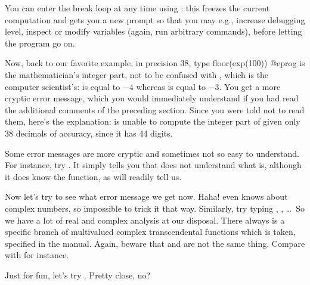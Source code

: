  You can enter the break loop at any time using
: this freezes the current computation and gets you a new
prompt so that you may e.g., increase debugging level, inspect or modify
variables (again, run arbitrary commands), before letting the program go
on.
\medskip

Now, back to our favorite example, in precision 38, type
\bprog
  floor(exp(100))
@eprog\noindent
{} is the mathematician's integer part, not to be confused with
, which is the computer scientist's:  is equal
to $-4$ whereas  is equal to $-3$.  You get a more
cryptic error message, which you would immediately understand if you had read
the additional comments of the preceding section. Since you were told not to
read them, here's the explanation:  is unable to compute the
integer part of  given only 38 decimals of accuracy, since
it has 44 digits.

Some error messages are more cryptic and sometimes not so easy to understand.
For instance, try . It simply tells you that  does not
understand what  is, although it does know the 
function, as  will readily tell us.

Now let's try  to see what error message we get now. Haha!
 even knows about complex numbers, so impossible to trick it that
way. Similarly, try typing , , \dots\ So we have a lot of real and complex analysis at our disposal.
There always is a specific branch of multivalued complex transcendental
functions which is taken, specified in the manual. Again, beware that
 and  are not the same thing. Compare  with
 for instance.

Just for fun, let's try . Pretty close, no?

